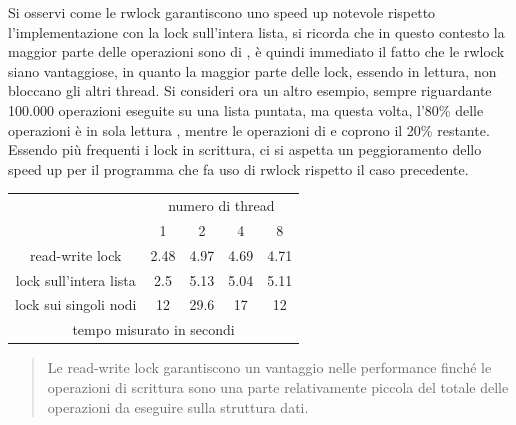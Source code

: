 \documentclass[10pt, letterpaper]{report}
\begin{document}
Si osservi come le rwlock garantiscono uno speed up notevole rispetto l'implementazione con la lock sull'intera lista, si ricorda che in questo contesto la maggior parte delle operazioni sono di , è quindi immediato il fatto che le rwlock siano vantaggiose, in quanto la maggior parte delle lock, essendo in lettura, non bloccano gli altri thread.\acc 
Si consideri ora un altro esempio, sempre riguardante 100.000 operazioni eseguite su una lista puntata, ma questa volta, l'80\% delle operazioni è in sola lettura , mentre le operazioni di  e  coprono il 20\% restante. Essendo più frequenti i lock in scrittura, ci si aspetta un peggioramento dello speed up per il programma che fa uso di rwlock rispetto il caso precedente.\begin{center}
    \begin{tabular}{ccccc}
        \cline{2-5}
        \multicolumn{1}{c|}{}                                                & \multicolumn{4}{c|}{\cellcolor[HTML]{ECF4FF}numero di thread}                                                                                                                                     \\ \cline{2-5} 
        \multicolumn{1}{c|}{}                                                & \multicolumn{1}{c|}{\cellcolor[HTML]{ECF4FF}1} & \multicolumn{1}{c|}{\cellcolor[HTML]{ECF4FF}2} & \multicolumn{1}{c|}{\cellcolor[HTML]{ECF4FF}4} & \multicolumn{1}{c|}{\cellcolor[HTML]{ECF4FF}8} \\ \hline
        \multicolumn{1}{|c|}{\cellcolor[HTML]{FFDFB9}read-write lock}        & \multicolumn{1}{c|}{2.48}                      & \multicolumn{1}{c|}{4.97}                      & \multicolumn{1}{c|}{4.69}                      & \multicolumn{1}{c|}{4.71}                      \\ \hline
        \multicolumn{1}{|c|}{\cellcolor[HTML]{FFDFB9}lock sull'intera lista} & \multicolumn{1}{c|}{2.5}                       & \multicolumn{1}{c|}{5.13}                      & \multicolumn{1}{c|}{5.04}                      & \multicolumn{1}{c|}{5.11}                      \\ \hline
        \multicolumn{1}{|c|}{\cellcolor[HTML]{FFDFB9}lock sui singoli nodi}  & \multicolumn{1}{c|}{12}                        & \multicolumn{1}{c|}{29.6}                      & \multicolumn{1}{c|}{17}                        & \multicolumn{1}{c|}{12}                        \\ \hline
        \multicolumn{5}{c}{tempo misurato in secondi}                                                                                                                                                                                                                           
        \end{tabular}
\end{center}
\begin{quotation}
    Le read-write lock garantiscono un vantaggio nelle performance finché le operazioni di scrittura sono una parte relativamente piccola del totale delle operazioni da eseguire sulla struttura dati.
\end{quotation}
\flowerLine 
\end{document}
